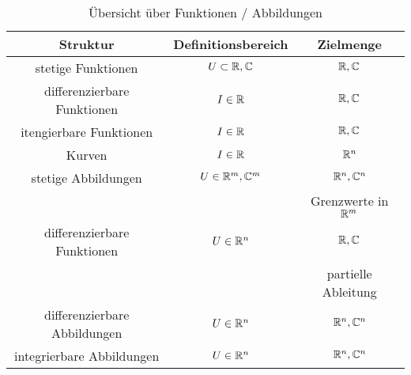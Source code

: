 \begin{table}[htb]
  \centering
  \begin{tabular}{c|c|c}
    Struktur&Definitionsbereich&Zielmenge\\
    \hline
    stetige Funktionen & $U\subset \mathbb{R},\mathbb{C}$&$\mathbb{R},\mathbb{C}$\\
    differenzierbare Funktionen & $I\in \mathbb{R}$&$\mathbb{R},\mathbb{C}$\\
    itengierbare Funktionen & $I\in \mathbb{R}$&$\mathbb{R},\mathbb{C}$\\
    Kurven & $I\in \mathbb{R}$&$\mathbb{R}^n$\\
    \hline
    stetige Abbildungen & $U\in \mathbb{R}^m, \mathbb{C}^m$ & $\mathbb{R}^n, \mathbb{C}^n$\\
    & & Grenzwerte in $\mathbb{R}^m$\\
    differenzierbare Funktionen & $U\in\mathbb{R}^n$ & $\mathbb{R},\mathbb{C}$\\
    & & partielle Ableitung\\
    differenzierbare Abbildungen & $U\in\mathbb{R}^n$ & $\mathbb{R}^n,\mathbb{C}^n$\\
    \hline
    integrierbare Abbildungen & $U\in\mathbb{R}^n$ & $\mathbb{R}^n,\mathbb{C}^n$
  \end{tabular}
  \caption{Übersicht über Funktionen / Abbildungen}
\end{table}
